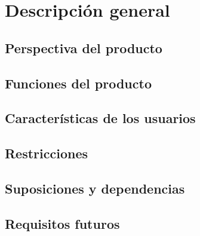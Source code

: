 \chapter{Descripción general}

\section{Perspectiva del producto}

\section{Funciones del producto}

\section{Características de los usuarios}

\section{Restricciones}

\section{Suposiciones y dependencias}

\section{Requisitos futuros}